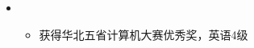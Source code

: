   \begin{itemize}[leftmargin=*]

    \item
      {\small
      \begin{itemize}
        \item 获得华北五省计算机大赛优秀奖，英语4级
      \end{itemize}
      }
  
  \end{itemize}